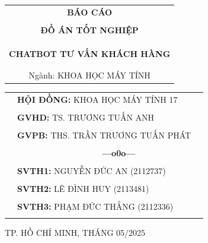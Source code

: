 \documentclass[a4paper]{article}
\theoremstyle{definition}
\begin{document}
\begin{titlepage}
\begin{center}
\begin{tabular}{c}
\multicolumn{1}{c}{\textbf{{\LARGE BÁO CÁO}}}\\
\\{\textbf{{\LARGE ĐỒ ÁN TỐT NGHIỆP}}}
\\
\\
\\
\\
{\fontsize{20pt}{21pt}\selectfont \textbf{CHATBOT TƯ VẤN KHÁCH HÀNG}}
\\\\
\\ {\Large Ngành: KHOA HỌC MÁY TÍNH}
\\
\end{tabular}
\end{center}
\vspace{0.5cm}
\begin{table}[h]
\begin{tabular}{rll}
\hspace{6 cm} &  \textbf{\Large HỘI ĐỒNG:} {\Large KHOA HỌC MÁY TÍNH 17}
\\
\\
\hspace{6 cm} &   \textbf{\Large GVHD:} {\Large TS. TRƯƠNG TUẤN ANH}
\\
\\
\hspace{6 cm} &   \textbf{\Large GVPB:} {\Large THS. TRẦN TRƯƠNG TUẤN PHÁT}
\\
\\
\hspace{6 cm} &     \textbf{$\;$ $\;$$\;$$\;$$\;$$\;$$\;$$\;$$\;$$\;$$\;$$\;$$\;$$\;$$\;$$\;$$\;$$\;$$\;$$\;$$\;$$\;$$\;$$\;$$\;$$\;$$\;$$\;$$\;$$\;$$\;$$\;$$\;$$\;$ \Large ---o0o---} 
\\
\\
\hspace{6 cm} &   \textbf{\Large SVTH1:} {\Large NGUYỄN ĐỨC AN (2112737)}
\\
\\
\hspace{6 cm}&   \textbf{\Large SVTH2:}  {\Large LÊ ĐÌNH HUY (2113481)}
\\
\\
\hspace{6 cm} &   \textbf{\Large SVTH3:}  {\Large PHẠM ĐỨC THẮNG (2112336)}
\\
\\
\end{tabular}
\end{table}
\vspace{0.5cm}
\begin{center}
{\Large TP. HỒ CHÍ MINH, THÁNG 05/2025 }
\end{center}
\end{titlepage}
\end{document}
